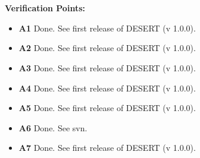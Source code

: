\documentclass[11pt,journal,draftclsnofoot,onecolumn,twoside,letterpaper]{IEEEtran}
\theoremstyle{definition} \newtheorem{definition}[]{Definition}
\theoremstyle{theorem} \newtheorem{theorem}[]{Theorem}
\begin{document}
\ \\
\ \\
{\bf Verification Points:}
\begin{itemize}
  \item {\bf A1} Done. See first release of DESERT (v 1.0.0).
  \item {\bf A2} Done. See first release of DESERT (v 1.0.0).
  \item {\bf A3} Done. See first release of DESERT (v 1.0.0).
  \item {\bf A4} Done. See first release of DESERT (v 1.0.0).
  \item {\bf A5} Done. See first release of DESERT (v 1.0.0).
  \item {\bf A6} Done. See svn.
  \item {\bf A7} Done. See first release of DESERT (v 1.0.0). 
\end{itemize}
\end{document}
